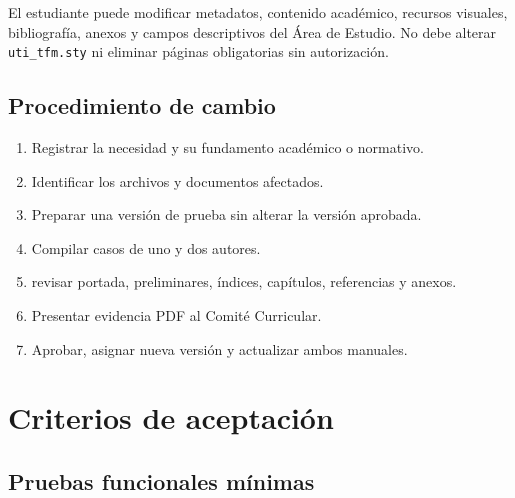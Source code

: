 \documentclass[12pt,a4paper,oneside]{report}
\begin{document}
El estudiante puede modificar metadatos, contenido académico, recursos visuales, bibliografía, anexos y campos descriptivos del Área de Estudio. No debe alterar \texttt{uti\_tfm.sty} ni eliminar páginas obligatorias sin autorización.

\section{Procedimiento de cambio}

\begin{enumerate}
  \item Registrar la necesidad y su fundamento académico o normativo.
  \item Identificar los archivos y documentos afectados.
  \item Preparar una versión de prueba sin alterar la versión aprobada.
  \item Compilar casos de uno y dos autores.
  \item revisar portada, preliminares, índices, capítulos, referencias y anexos.
  \item Presentar evidencia PDF al Comité Curricular.
  \item Aprobar, asignar nueva versión y actualizar ambos manuales.
\end{enumerate}

\chapter{Criterios de aceptación}

\section{Pruebas funcionales mínimas}
\end{document}
